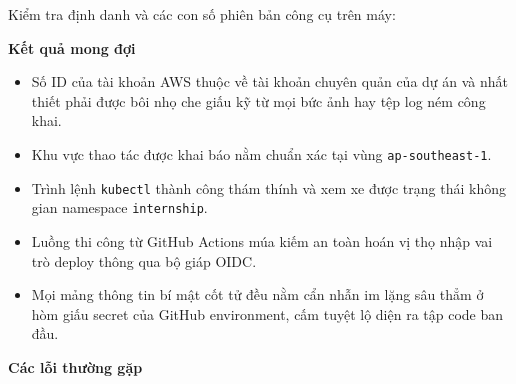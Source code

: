 Kiểm tra định danh và các con số phiên bản công cụ trên máy:

\begin{Shaded}
\begin{Highlighting}[]
 
 
 
 
 
 
\end{Highlighting}
\end{Shaded}

\vspace{0.5em}\noindent\textbf{Kết quả mong đợi}\par

\begin{itemize}
\tightlist
\item
  Số ID của tài khoản AWS thuộc về tài khoản chuyên quản của dự án và
  nhất thiết phải được bôi nhọ che giấu kỹ từ mọi bức ảnh hay tệp log
  ném công khai.
\item
  Khu vực thao tác được khai báo nằm chuẩn xác tại vùng
  \texttt{ap-\allowbreak{}southeast-\allowbreak{}1}.
\item
  Trình lệnh \texttt{kubectl} thành công thám thính và xem xe được trạng
  thái không gian namespace \texttt{internship}.
\item
  Luồng thi công từ GitHub Actions múa kiếm an toàn hoán vị thọ nhập vai
  trò deploy thông qua bộ giáp OIDC.
\item
  Mọi mảng thông tin bí mật cốt tử đều nằm cẩn nhẫn im lặng sâu thẳm ở
  hòm giấu secret của GitHub environment, cấm tuyệt lộ diện ra tập code
  ban đầu.
\end{itemize}

\vspace{0.5em}\noindent\textbf{Các lỗi thường
gặp}\par

